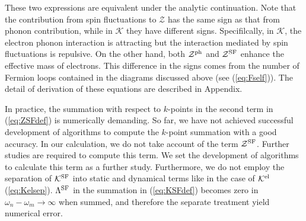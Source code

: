 These two expressions are equivalent under the analytic continuation.
Note that the contribution from spin fluctuations to $\mathcal Z$
has the same sign as that from phonon contribution, while in $\mathcal K$ they have different signs.
Specifilcally, in $\mathcal K$, the electron phonon interaction is attracting but the interaction mediated by
spin fluctuations is repulsive. On the other hand, both $\mathcal Z^{\rm ph}$ and $\mathcal Z^{\rm SF}$
enhance the effective mass of electrons.
This difference in the signs comes from the number of Fermion loops contained in the diagrams discussed above
(see (\ref{eq:Fself})). The detail of derivation of these equations are described in Appendix.

In practice, the summation with respect to $k$-points in the second term in 
(\ref{eq:ZSFdef}) is numerically demanding.
So far, we have not achieved successful development of algorithms to compute the $k$-point summation 
with a good accuracy. In our calculation, we do not take account of the term $\mathcal Z^{\rm SF}$.
Further studies are required to compute this term.
We set the development of algorithms to calculate this term as a further study.
Furthermore, we do not employ the separation of $\mathcal K^{\rm SF}$ into static and dynamical
terms like in the case of $\mathcal K^{\rm el}$ (\ref{eq:Kelsep}).
$\Lambda^{\rm SF}$ in the summation in (\ref{eq:KSFdef}) becomes zero in $\omega_n - \omega_m \rightarrow \infty$ when summed,
and therefore the separate treatment yield numerical error.

